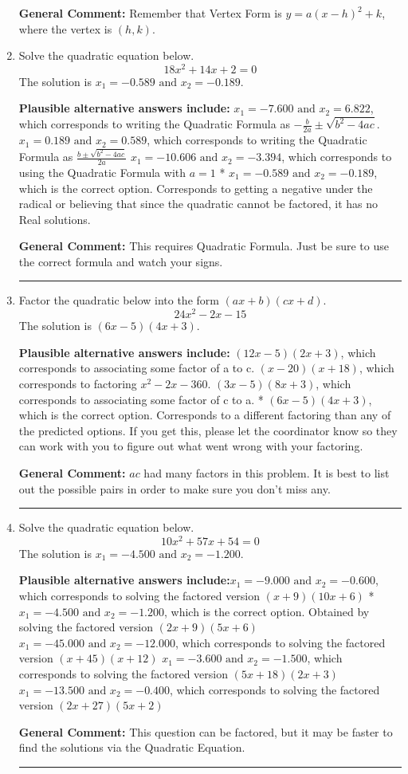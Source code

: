 \documentclass{extbook}[14pt]
\newcommand{\litem}[1]{\item #1

\rule{\textwidth}{0.4pt}}
\begin{document}
\begin{enumerate}
{\textbf{General Comment:} Remember that Vertex Form is $y = a(x-h)^2+k$, where the vertex is $(h, k)$.
}
\litem{
Solve the quadratic equation below.
\[ 18x^{2} +14 x + 2 = 0 \]The solution is \( x_1 = -0.589 \text{ and } x_2 = -0.189 \).\begin{enumerate}[label=\Alph*.]
\textbf{Plausible alternative answers include:} $x_1 = -7.600 \text{ and } x_2 = 6.822$, which corresponds to writing the Quadratic Formula as $-\frac{b}{2a} \pm \sqrt{b^2 - 4ac}$.
 $x_1 = 0.189 \text{ and } x_2 = 0.589$, which corresponds to writing the Quadratic Formula as $\frac{b \pm \sqrt{b^2 - 4ac}}{2a}$
 $x_1 = -10.606 \text{ and } x_2 = -3.394$, which corresponds to using the Quadratic Formula with $a=1$
* $x_1 = -0.589 \text{ and } x_2 = -0.189$, which is the correct option.
Corresponds to getting a negative under the radical or believing that since the quadratic cannot be factored, it has no Real solutions.
\end{enumerate}

\textbf{General Comment:} This requires Quadratic Formula. Just be sure to use the correct formula and watch your signs.
}
\litem{
Factor the quadratic below into the form $(ax+b)(cx+d)$.
\[ 24x^{2} -2 x -15 \]The solution is \( (6x -5)(4x + 3) \).\begin{enumerate}[label=\Alph*.]
\textbf{Plausible alternative answers include:} $(12x -5)(2x + 3)$, which corresponds to associating some factor of a to c.
 $(x -20)(x + 18)$, which corresponds to factoring $x^{2} -2 x -360$.
 $(3x -5)(8x + 3)$, which corresponds to associating some factor of c to a.
* $(6x -5)(4x + 3)$, which is the correct option.
 Corresponds to a different factoring than any of the predicted options. If you get this, please let the coordinator know so they can work with you to figure out what went wrong with your factoring.
\end{enumerate}

\textbf{General Comment:} $ac$ had many factors in this problem. It is best to list out the possible pairs in order to make sure you don't miss any.
}
\litem{
Solve the quadratic equation below.
\[ 10x^{2} +57 x + 54 = 0 \]The solution is \( x_1 = -4.500 \text{ and } x_2 = -1.200 \).\begin{enumerate}[label=\Alph*.]
\textbf{Plausible alternative answers include:}$x_1 = -9.000 \text{ and } x_2 = -0.600$, which corresponds to solving the factored version $(x + 9)(10x + 6)$
* $x_1 = -4.500 \text{ and } x_2 = -1.200$, which is the correct option. Obtained by solving the factored version $(2x + 9)(5x + 6)$
$x_1 = -45.000 \text{ and } x_2 = -12.000$, which corresponds to solving the factored version $(x + 45)(x + 12)$
$x_1 = -3.600 \text{ and } x_2 = -1.500$, which corresponds to solving the factored version $(5x + 18)(2x + 3)$
$x_1 = -13.500 \text{ and } x_2 = -0.400$, which corresponds to solving the factored version $(2x + 27)(5x + 2)$
\end{enumerate}

\textbf{General Comment:} This question can be factored, but it may be faster to find the solutions via the Quadratic Equation.
}
\end{enumerate}
\end{document}

